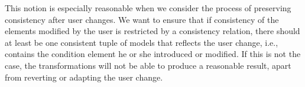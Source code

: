 
This notion is especially reasonable when we consider the process of preserving consistency after user changes.
We want to ensure that if consistency of the elements modified by the user is restricted by a consistency relation, there should at least be one consistent tuple of models that reflects the user change, i.e., contains the condition element he or she introduced or modified.
If this is not the case, the transformations will not be able to produce a reasonable result, apart from reverting or adapting the user change.

